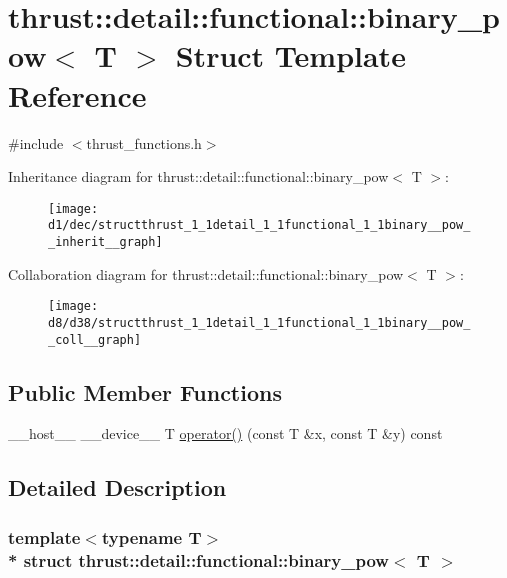\hypertarget{structthrust_1_1detail_1_1functional_1_1binary__pow}{}\section{thrust\+:\+:detail\+:\+:functional\+:\+:binary\+\_\+pow$<$ T $>$ Struct Template Reference}
\label{structthrust_1_1detail_1_1functional_1_1binary__pow}


{\ttfamily \#include $<$thrust\+\_\+functions.\+h$>$}



Inheritance diagram for thrust\+:\+:detail\+:\+:functional\+:\+:binary\+\_\+pow$<$ T $>$\+:
\nopagebreak
\begin{figure}[H]
\begin{center}
\leavevmode
\texttt{[image: d1/dec/structthrust\_1\_1detail\_1\_1functional\_1\_1binary\_\_pow\_\_inherit\_\_graph]}
\end{center}
\end{figure}


Collaboration diagram for thrust\+:\+:detail\+:\+:functional\+:\+:binary\+\_\+pow$<$ T $>$\+:
\nopagebreak
\begin{figure}[H]
\begin{center}
\leavevmode
\texttt{[image: d8/d38/structthrust\_1\_1detail\_1\_1functional\_1\_1binary\_\_pow\_\_coll\_\_graph]}
\end{center}
\end{figure}
\subsection*{Public Member Functions}
\begin{DoxyCompactItemize}
\item 
\+\_\+\+\_\+host\+\_\+\+\_\+ \+\_\+\+\_\+device\+\_\+\+\_\+ T \hyperlink{structthrust_1_1detail_1_1functional_1_1binary__pow_a94eb06171d280e4b64a1483e5332dd87}{operator()} (const T \&x, const T \&y) const 
\end{DoxyCompactItemize}


\subsection{Detailed Description}
\subsubsection*{template$<$typename T$>$\\*
struct thrust\+::detail\+::functional\+::binary\+\_\+pow$<$ T $>$}



